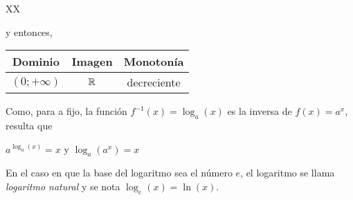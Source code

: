 \documentclass[../Teoría.root.tex]{subfiles}
\begin{document}
\begin{tabularx}{\textwidth}{XX}
\begin{center}
\begin{tikzpicture}
                    \begin{axis}[
                        scale=0.8,
                        axis lines = middle,
                        axis equal,
                        xlabel = \(x\),
                        ylabel = {\(y\)},
                        domain=-5:5,
                        samples= 100,
                        ymin=-2,
                        ymax=4
                    ]
                    \addplot[color=blue] {Log(0.5,\x)};
                    \addlegendentry{\(\textstyle\log_\frac{1}{2}(x)\)}
                    \end{axis}
                \end{tikzpicture} 
            \end{center} y entonces,
            \begin{center}
                \begin{tabular}{|c|c|c|}
                    \hline
                    Dominio & Imagen & Monotonía\\\hline
                    \((0;+\infty)\) & \(\mathbb{R}\) & decreciente\\
                    \hline
                \end{tabular}
            \end{center}
        \end{tabularx}
        Como, para a fijo, la función \(f^{−1}(x) = \log_a(x)\) es la inversa de \(f(x) = a^x\), resulta que
        \begin{center}
           \(a^{\log_a(x)}=x\) y \(\log_a(a^x)=x\)
        \end{center}
        En el caso en que la base del logaritmo sea el número \(e\), el logaritmo se llama \textit{logaritmo natural} y se nota \(\log_e(x) = \ln(x)\).
\end{document}
